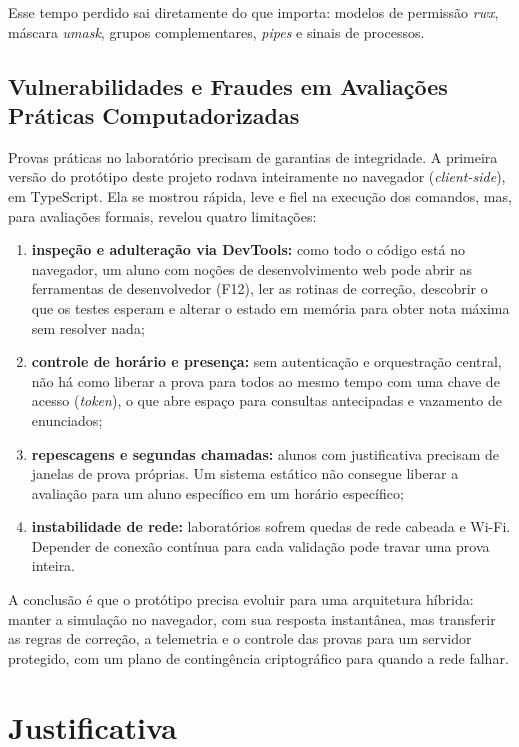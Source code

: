 Esse tempo perdido sai diretamente do que importa: modelos de permissão \textit{rwx}, máscara \textit{umask}, grupos complementares, \textit{pipes} e sinais de processos.

\subsection{Vulnerabilidades e Fraudes em Avaliações Práticas Computadorizadas}

Provas práticas no laboratório precisam de garantias de integridade. A primeira versão do protótipo deste projeto rodava inteiramente no navegador (\textit{client-side}), em TypeScript. Ela se mostrou rápida, leve e fiel na execução dos comandos, mas, para avaliações formais, revelou quatro limitações:

\begin{enumerate}
    \item \textbf{inspeção e adulteração via DevTools:} como todo o código está no navegador, um aluno com noções de desenvolvimento web pode abrir as ferramentas de desenvolvedor (F12), ler as rotinas de correção, descobrir o que os testes esperam e alterar o estado em memória para obter nota máxima sem resolver nada;
    \item \textbf{controle de horário e presença:} sem autenticação e orquestração central, não há como liberar a prova para todos ao mesmo tempo com uma chave de acesso (\textit{token}), o que abre espaço para consultas antecipadas e vazamento de enunciados;
    \item \textbf{repescagens e segundas chamadas:} alunos com justificativa precisam de janelas de prova próprias. Um sistema estático não consegue liberar a avaliação para um aluno específico em um horário específico;
    \item \textbf{instabilidade de rede:} laboratórios sofrem quedas de rede cabeada e Wi-Fi. Depender de conexão contínua para cada validação pode travar uma prova inteira.
\end{enumerate}

A conclusão é que o protótipo precisa evoluir para uma arquitetura híbrida: manter a simulação no navegador, com sua resposta instantânea, mas transferir as regras de correção, a telemetria e o controle das provas para um servidor protegido, com um plano de contingência criptográfico para quando a rede falhar.

\section{Justificativa}
\label{sec:justificativa}


